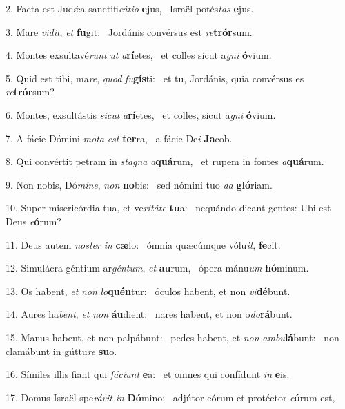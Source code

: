 2. Facta est Judǽa sanctifi\textit{cá}\textit{ti}\textit{o} \textbf{e}jus, \ast\  Israël potés\textit{tas} \textbf{e}jus.\

3. Mare \textit{vi}\textit{dit}, \textit{et} \textbf{fu}git: \ast\  Jordánis convérsus est \textit{re}\textbf{trór}sum.\

4. Montes exsultavé\textit{runt} \textit{ut} \textit{a}\textbf{rí}etes, \ast\  et colles sicut a\textit{gni} \textbf{ó}vium.\

5. Quid est tibi, ma\textit{re}, \textit{quod} \textit{fu}\textbf{gís}ti: \ast\  et tu, Jordánis, quia convérsus es \textit{re}\textbf{trór}sum?\

6. Montes, exsultástis \textit{sic}\textit{ut} \textit{a}\textbf{rí}etes, \ast\  et colles, sicut a\textit{gni} \textbf{ó}vium.\

7. A fácie Dómini \textit{mo}\textit{ta} \textit{est} \textbf{ter}ra, \ast\  a fácie De\textit{i} \textbf{Ja}cob.\

8. Qui convértit petram in \textit{sta}\textit{gna} \textit{a}\textbf{quá}rum, \ast\  et rupem in fontes \textit{a}\textbf{quá}rum.\

9. Non nobis, Dó\textit{mi}\textit{ne}, \textit{non} \textbf{no}bis: \ast\  sed nómini tuo \textit{da} \textbf{gló}riam.\

10. Super misericórdia tua, et ve\textit{ri}\textit{tá}\textit{te} \textbf{tu}a: \ast\  nequándo dicant gentes: Ubi est Deus \textit{e}\textbf{ó}rum?\

11. Deus autem \textit{nos}\textit{ter} \textit{in} \textbf{cæ}lo: \ast\  ómnia quæcúmque vólu\textit{it}, \textbf{fe}cit.\

12. Simulácra géntium ar\textit{gén}\textit{tum}, \textit{et} \textbf{au}rum, \ast\  ópera mánu\textit{um} \textbf{hó}minum.\

13. Os habent, \textit{et} \textit{non} \textit{lo}\textbf{quén}tur: \ast\  óculos habent, et non \textit{vi}\textbf{dé}bunt.\

14. Aures ha\textit{bent}, \textit{et} \textit{non} \textbf{áu}dient: \ast\  nares habent, et non o\textit{do}\textbf{rá}bunt.\

15. Manus habent, et non palpábunt: \dag\  pedes habent, et \textit{non} \textit{am}\textit{bu}\textbf{lá}bunt: \ast\  non clamábunt in gúttu\textit{re} \textbf{su}o.\

16. Símiles illis fiant qui \textit{fá}\textit{ci}\textit{unt} \textbf{e}a: \ast\  et omnes qui confídunt \textit{in} \textbf{e}is.\

17. Domus Israël spe\textit{rá}\textit{vit} \textit{in} \textbf{Dó}mino: \ast\  adjútor eórum et protéctor \textit{e}\textbf{ó}rum est,\

